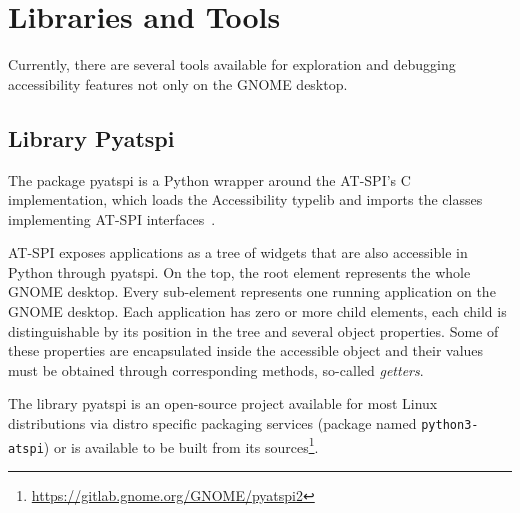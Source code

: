 \section{Libraries and Tools}
Currently, there are several tools available for exploration and debugging accessibility features not only on the GNOME desktop.

\subsection{Library Pyatspi}\label{library_pyatspi}
The package pyatspi is a Python wrapper around the AT-SPI's C implementation, which loads the Accessibility typelib and imports the classes implementing AT-SPI interfaces~\cite{pyatspi}.

AT-SPI exposes applications as a tree of widgets that are also accessible in Python through pyatspi. On the top, the root element represents the whole GNOME desktop. Every sub-element represents one running application on the GNOME desktop. Each application has zero or more child elements, each child is distinguishable by its position in the tree and several object properties. Some of these properties are encapsulated inside the accessible object and their values must be obtained through corresponding methods, so-called \textit{getters}. 

The library pyatspi is an open-source project available for most Linux distributions via distro specific packaging services (package named \texttt{python3-atspi}) or is available to be built from its sources\footnote{\url{https://gitlab.gnome.org/GNOME/pyatspi2}}.


